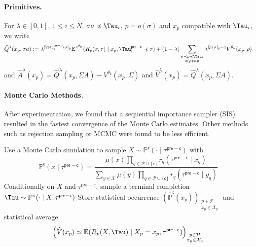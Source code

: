 \documentclass[12pt, a4paper]{article}
\begin{document}
\paragraph{Primitives.}
For $\lambda \in [0,1]$, $1 \leq i \leq N$, $\sigma a \preccurlyeq \Tau_i$, $p = o(\sigma)$ and $x_p$ compatible with $\Tau_i$, we write
\begin{equation}\label{eq:rao-blackwell-lambda-return}
  \widehat{Q}^\lambda(x_p, \sigma a)
  :=
  \lambda^{|\Tau_i^{\mathsf{pre-c}} \setminus \sigma|_p} \mathbb{E}^{\pi^{\theta_k}}(R_{p}(x, \tau) \mid x_p, \Tau_i^{\mathsf{pre-c}} \preccurlyeq \tau)
  + (1 - \lambda) \sum_{\substack{\sigma \prec \rho \preccurlyeq \Tau_i \\ o(\rho) = p}}
  \lambda^{|\rho \setminus \sigma|_p - 1} V^{\theta_k}(x_p,\rho)
\end{equation}
and $\widehat{A}^\lambda(x_p) = \widehat{Q}^\lambda(x_p,\Sigma A) - V^{\theta_k}(x_p,\Sigma)$
and $\widehat{V}^\lambda(x_p) = \widehat{Q}^\lambda(x_p,\Sigma A)$.

\paragraph{Monte Carlo Methods.}
After experimentation, we found that a sequential importance sampler (SIS) resulted in the fastest convergence of the Monte Carlo estimates.
Other methods such as rejection sampling or MCMC were found to be less efficient.

\begin{algorithm}[H]
\caption{$(\widehat{\mathbb P}^{\mathfrak r},\widehat V)\gets$~\texttt{PreTerminalMC}$(\mathfrak r,\tau^{\mathsf{pre-c}})$}
\label{alg:mc-preterminal}
\DontPrintSemicolon
{}
  Use a Monte Carlo simulation to sample $X \sim \mathbb{P}^\mathfrak{r}(\cdot\mid\tau^{\mathsf{pre-c}})$ with
  \[
    \mathbb{P}^\mathfrak{r}(x\mid\tau^{\mathsf{pre-c}})
    = \frac{\mu(x)\prod_{q \in \mathcal P \cup \{\mathsf c\}} r_q(\tau^{\mathsf{pre-c}} \mid x_q)}
           {\sum_{y\in\mathcal X} \mu(y)\prod_{q \in \mathcal P \cup \{\mathsf c\}} r_q(\tau^{\mathsf{pre-c}} \mid y_q)}
  \]\;
  Conditionally on $X$ and $\tau^{\mathsf{pre-c}}$, sample a terminal completion
  $\Tau\sim\mathbb P^\pi(\cdot\mid X,\tau^{\mathsf{pre-c}})$\;
  Store statistical occurrence $(\widehat{\mathbb P}^{\mathfrak r}(x_p))_{\substack{p \in \mathcal{P} \\ x_p \in \mathcal{X}_p}}$ and statistical average
  \[
    \left(\widehat{V}(x_p) \simeq \mathbb{E}(R_p(X,\Tau) \mid X_p = x_p,\tau^{\mathsf{pre-c}})\right)_{\substack{p \in \mathcal{P} \\ x_p \in \mathcal{X}_p}}
  \]
\end{algorithm}
\end{document}
